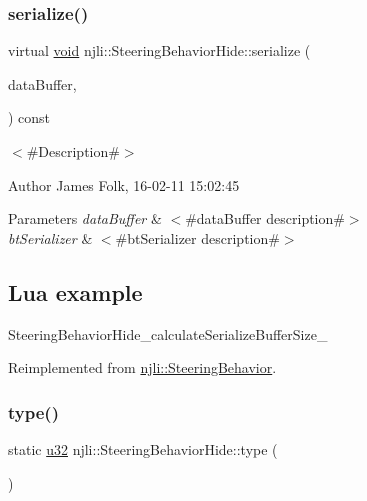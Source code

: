 \subsubsection{\texorpdfstring{serialize()}{serialize()}}
{\footnotesize\ttfamily virtual \mbox{\hyperlink{_thread_8h_af1e856da2e658414cb2456cb6f7ebc66}{void}} njli\+::\+Steering\+Behavior\+Hide\+::serialize (\begin{DoxyParamCaption}\item[{\mbox{\hyperlink{_thread_8h_af1e856da2e658414cb2456cb6f7ebc66}{void}} $\ast$}]{data\+Buffer,  }\item[{bt\+Serializer $\ast$}]{ }\end{DoxyParamCaption}) const\hspace{0.3cm}{\ttfamily [virtual]}}



$<$\#\+Description\#$>$ 

\begin{DoxyAuthor}{Author}
James Folk, 16-\/02-\/11 15\+:02\+:45
\end{DoxyAuthor}

\begin{DoxyParams}{Parameters}
{\em data\+Buffer} & $<$\#data\+Buffer description\#$>$ \\
\hline
{\em bt\+Serializer} & $<$\#bt\+Serializer description\#$>$\\
\hline
\end{DoxyParams}
\hypertarget{classnjli_1_1_steering_behavior_wander_ex1}{}\subsection{Lua example}\label{classnjli_1_1_steering_behavior_wander_ex1}

\begin{DoxyCodeInclude}
\end{DoxyCodeInclude}
Steering\+Behavior\+Hide\+\_\+calculate\+Serialize\+Buffer\+Size\+\_\+ 

Reimplemented from \mbox{\hyperlink{classnjli_1_1_steering_behavior_aa8494cb4a327c0040f64cfe8b393786e}{njli\+::\+Steering\+Behavior}}.

\mbox{\label{classnjli_1_1_steering_behavior_hide_a02ebee0ce5b418875b4a367cb817465d}} 
\subsubsection{\texorpdfstring{type()}{type()}}
{\footnotesize\ttfamily static \mbox{\hyperlink{_util_8h_a10e94b422ef0c20dcdec20d31a1f5049}{u32}} njli\+::\+Steering\+Behavior\+Hide\+::type (\begin{DoxyParamCaption}{ }\end{DoxyParamCaption})\hspace{0.3cm}{\ttfamily [static]}}



